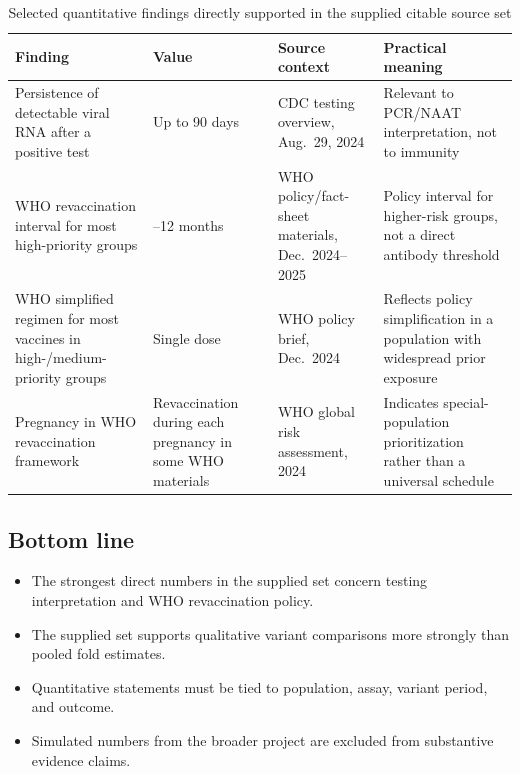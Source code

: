 \documentclass[12pt]{article}
\begin{document}
\begin{table}[H]
\centering
\caption{Selected quantitative findings directly supported in the supplied citable source set}
\begin{tabularx}{\textwidth}{>{\raggedright\arraybackslash}p{3.4cm} >{\raggedright\arraybackslash}p{2.0cm} >{\raggedright\arraybackslash}p{2.2cm} >{\raggedright\arraybackslash}X}
\toprule
Finding & Value & Source context & Practical meaning \\
\midrule
Persistence of detectable viral RNA after a positive test & Up to 90 days & CDC testing overview, Aug.\ 29, 2024 \cite{ref1} & Relevant to PCR/NAAT interpretation, not to immunity \\
WHO revaccination interval for most high-priority groups & 6--12 months & WHO policy/fact-sheet materials, Dec.\ 2024--2025 \cite{ref9,ref10,ref11,ref12} & Policy interval for higher-risk groups, not a direct antibody threshold \\
WHO simplified regimen for most vaccines in high-/medium-priority groups & Single dose & WHO policy brief, Dec.\ 2024 \cite{ref9,ref10} & Reflects policy simplification in a population with widespread prior exposure \\
Pregnancy in WHO revaccination framework & Revaccination during each pregnancy in some WHO materials & WHO global risk assessment, 2024 \cite{ref11} & Indicates special-population prioritization rather than a universal schedule \\
\bottomrule
\end{tabularx}
\end{table}

\subsection*{Bottom line}
\begin{itemize}[leftmargin=1.5em]
    \item The strongest direct numbers in the supplied set concern testing interpretation and WHO revaccination policy.
    \item The supplied set supports qualitative variant comparisons more strongly than pooled fold estimates.
    \item Quantitative statements must be tied to population, assay, variant period, and outcome.
    \item Simulated numbers from the broader project are excluded from substantive evidence claims.
\end{itemize}
\end{document}
